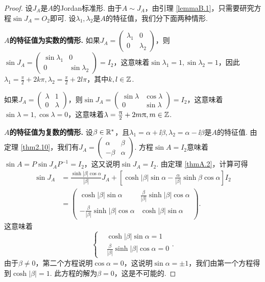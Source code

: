 \begin{proof}
  设$J_A$是$A$的Jordan标准形. 由于$A\sim J_A$，由引理 \ref{lemmaB.1}，只需要研究方程$\sin J_A=O_2$即可. 设$\lambda_1,\lambda_2$是$A$的特征值，我们分下面两种情形.

  {\bfseries $A$的特征值为实数的情形.} 如果$J_A=\begin{pmatrix}
    \lambda_1 & 0 \\
    0 & \lambda_2
  \end{pmatrix}$，则$\sin J_A=\begin{pmatrix}
    \sin\lambda_1 & 0 \\
    0 & \sin\lambda_2
  \end{pmatrix}=I_2$，这意味着$\sin\lambda_1=1,\sin\lambda_2=1$，因此$\lambda_1=\frac\pi2+2k\pi,\lambda_2=\frac\pi2+2l\pi$，其中$k,l\in\mathbb Z$.

  如果$J_A=\begin{pmatrix}
    \lambda & 1 \\
    0 & \lambda
  \end{pmatrix}$，则$\sin J_A=\begin{pmatrix}
    \sin\lambda & \cos \lambda \\
    0 & \sin \lambda
  \end{pmatrix}=I_2$，这意味着$\sin\lambda=1,\cos\lambda=0$，这意味着$\lambda=\frac{\uppi}2+2m\uppi,m\in\mathbb Z$.

  {\bfseries $A$的特征值为复数的情形.} 设$\beta\in\mathbb R^\ast$，且$\lambda_1=\alpha+\ii\beta,\lambda_2
  =\alpha-\ii\beta$是$A$的特征值. 由定理 \ref{thm2.10}，我们有$J_A=\begin{pmatrix}
    \alpha & \beta \\
    -\beta & \alpha
  \end{pmatrix}$. 方程$\sin A=I_2$意味着$\sin A=P\sin J_AP^{-1}=I_2$，这又说明$\sin J_A=I_2$. 由定理 \ref{thmA.2}，计算可得
  \begin{align*}
    \sin J_A & = \frac{\sinh|\beta|\cos\alpha}{|\beta|}J_A +
      \left[ \cosh|\beta|\sin\alpha - \frac\alpha{|\beta|}\sinh\beta\cos\alpha \right]I_2 \\
      & = \begin{pmatrix}
        \cosh|\beta|\sin\alpha & \frac\beta{|\beta|}\sinh|\beta|\cos\alpha \\
        -\frac\beta{|\beta|}\sinh|\beta|\cos\alpha & \cosh|\beta|\sin\alpha
      \end{pmatrix}.
  \end{align*}
  这意味着
  \[
    \left\{
      \begin{aligned}
        & \cosh|\beta|\sin\alpha = 1\\
        & \frac\beta{|\beta|}\sinh|\beta|\cos\alpha = 0
      \end{aligned}
    \right..
  \]
  由于$\beta\ne0$，第二个方程说明$\cos\alpha=0$，这说明$\sin\alpha=\pm1$，我们由第一个方程得到$\cosh|\beta|=1$. 此方程的解为$\beta=0$，这是不可能的.
\end{proof}

